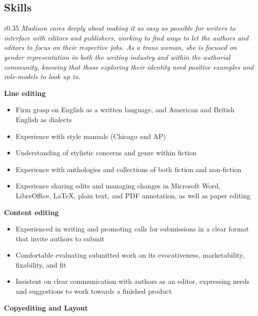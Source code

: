 \subsection{Skills}

\begin{wrapfigure}{r}{0.35\linewidth}
  \textit{\color{titlegreydark} \large Madison cares deeply about making it as easy as possible for writers to interface with editors and publishers, working to find ways to let the authors and editors to focus on their respective jobs. As a trans woman, she is focused on gender representation in both the writing industry and within the authorial community, knowing that those exploring their identity need positive examples and role-models to look up to.}
  \vspace{-1in}
\end{wrapfigure}

\textbf{Line editing}

\begin{itemize}
  \item Firm grasp on English as a written language, and American and British English as dialects
  \item Experience with style manuals (Chicago and AP)
  \item Understanding of stylistic concerns and genre within fiction
  \item Experience with anthologies and collections of both fiction and non-fiction
  \item Experience sharing edits and managing changes in Microsoft Word, LibreOffice, \LaTeX, plain text, and PDF annotation, as well as paper editing
\end{itemize}

\hspace{-1.5em}\textbf{Content editing}

\begin{itemize}
  \item Experienced in writing and promoting calls for submissions in a clear format that invite authors to submit
  \item Comfortable evaluating submitted work on its evocativeness, marketability, fixability, and fit
  \item Insistent on clear communication with authors as an editor, expressing needs and suggestions to work towards a finished product
\end{itemize}

\hspace{-1.5em}\textbf{Copyediting and Layout}

